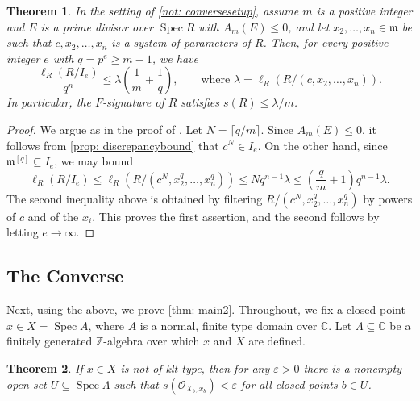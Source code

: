 \documentclass[11pt,leqno]{amsart}
\numberwithin{equation}{section}
\newtheorem{theorem}{Theorem}[section]
\theoremstyle{definition}
\theoremstyle{remark}
\renewcommand{\O}{\mathcal{O}}
\newcommand{\C}{\mathbb{C}}
\newcommand{\Z}{\mathbb{Z}}
\newcommand{\vare}{\varepsilon}
\newcommand{\Spec}{\operatorname{Spec}}
\providecommand{\frm}{}
\renewcommand{\frm}{\mathfrak{m}}
\begin{document}
\begin{theorem}\label{thm: charpconverse}
In the setting of \cref{not: conversesetup}, assume $m$ is a positive integer and $E$ is a prime divisor over $\Spec R$ with $A_m(E) \leq 0$, and let $x_2, \dots, x_n \in \frm$ be such that $c, x_2, \dots, x_n$ is a system of parameters of $R$. Then, for every positive integer $e$ with $q = p^e \geq m - 1$, we have $$\frac{\ell_R(R/I_e)}{q^n} \leq \lambda\left(\frac{1}{m} + \frac{1}{q}\right), \qquad \text{where } \lambda = \ell_R(R/(c, x_2, \dots, x_n)).$$ In particular, the $F$-signature of $R$ satisfies $s(R) \leq \lambda/m$.
\end{theorem}


\begin{proof}
We argue as in the proof of \cite[Theorem 3.3]{BST13}. Let $N = \lceil q/m \rceil$. Since $A_m(E) \leq 0$, it follows from \cref{prop: discrepancybound} that $c^N \in I_e$. On the other hand, since $\frm^{[q]} \subseteq I_e$, we may bound $$\ell_R(R/I_e) \leq \ell_R(R/(c^N, x_2^q, \dots, x_n^q)) \leq N q^{n-1}\lambda \leq \left(\frac{q}{m} + 1\right)q^{n-1}\lambda.$$ The second inequality above is obtained by filtering $R/(c^N, x_2^q, \dots, x_n^q)$ by powers of $c$ and of the $x_i$. This proves the first assertion, and the second follows by letting $e \to \infty$.
\end{proof}


\subsection*{The Converse} Next, using the above, we prove \cref{thm: main2}. Throughout, we fix a closed point $x \in X = \Spec A$, where $A$ is a normal, finite type domain over $\C$.  Let $\Lambda \subseteq \C$ be a finitely generated $\Z$-algebra over which $x$ and $X$ are defined. 

\begin{theorem} \label{thm: conversedirection}
    If $x \in X$ is not of klt type, then for any $\vare > 0$ there is a nonempty open set $U \subseteq \Spec \Lambda$ such that $s(\O_{X_b, x_b}) < \vare$ for all closed points $b \in U$.
\end{theorem}
\end{document}
